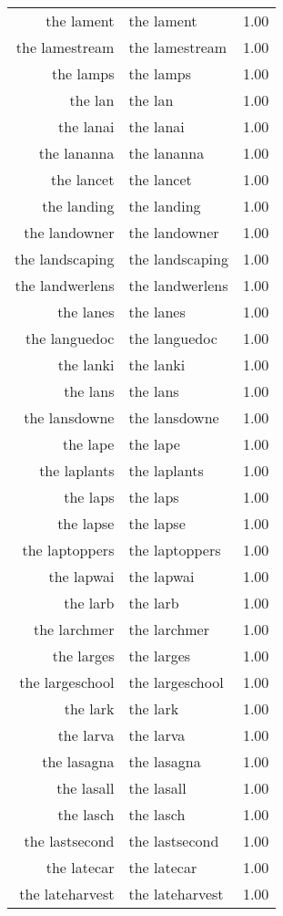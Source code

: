 \begin{table}[ht]
\begin{tabular}{rlr}
  the lament & the lament & 1.00 \\ 
  the lamestream & the lamestream & 1.00 \\ 
  the lamps & the lamps & 1.00 \\ 
  the lan & the lan & 1.00 \\ 
  the lanai & the lanai & 1.00 \\ 
  the lananna & the lananna & 1.00 \\ 
  the lancet & the lancet & 1.00 \\ 
  the landing & the landing & 1.00 \\ 
  the landowner & the landowner & 1.00 \\ 
  the landscaping & the landscaping & 1.00 \\ 
  the landwerlens & the landwerlens & 1.00 \\ 
  the lanes & the lanes & 1.00 \\ 
  the languedoc & the languedoc & 1.00 \\ 
  the lanki & the lanki & 1.00 \\ 
  the lans & the lans & 1.00 \\ 
  the lansdowne & the lansdowne & 1.00 \\ 
  the lape & the lape & 1.00 \\ 
  the laplants & the laplants & 1.00 \\ 
  the laps & the laps & 1.00 \\ 
  the lapse & the lapse & 1.00 \\ 
  the laptoppers & the laptoppers & 1.00 \\ 
  the lapwai & the lapwai & 1.00 \\ 
  the larb & the larb & 1.00 \\ 
  the larchmer & the larchmer & 1.00 \\ 
  the larges & the larges & 1.00 \\ 
  the largeschool & the largeschool & 1.00 \\ 
  the lark & the lark & 1.00 \\ 
  the larva & the larva & 1.00 \\ 
  the lasagna & the lasagna & 1.00 \\ 
  the lasall & the lasall & 1.00 \\ 
  the lasch & the lasch & 1.00 \\ 
  the lastsecond & the lastsecond & 1.00 \\ 
  the latecar & the latecar & 1.00 \\ 
  the lateharvest & the lateharvest & 1.00 \\ 

\end{tabular}
\end{table}
